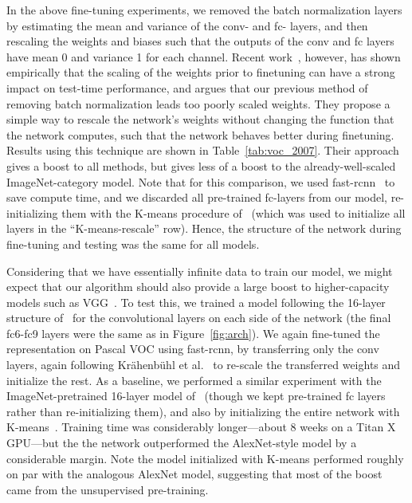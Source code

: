 \documentclass[10pt,twocolumn,letterpaper]{article}
\begin{document}
In the above fine-tuning experiments, we removed the batch normalization layers by estimating the
mean and variance of the conv- and fc- layers, and then rescaling the weights and biases such that the outputs of the conv and fc layers have mean 0 and variance 1 for each channel.  
Recent work~\cite{krahenbuhl2015data},
however, has shown empirically that the scaling of the weights prior to finetuning can have a
strong impact on test-time performance, and argues that our previous method of
removing batch normalization leads too poorly scaled weights.  They propose a simple way to
rescale the network's weights without changing the function that the network computes, such that
the network behaves better during finetuning.  Results using this technique are shown 
in Table~\ref{tab:voc_2007}.
Their approach gives a boost to all methods, but gives less of a boost to the 
already-well-scaled ImageNet-category model.  Note that for this comparison, we 
used fast-rcnn~\cite{girshickICCV15fastrcnn} to save compute time, and we discarded all 
pre-trained fc-layers from our model, re-initializing them with the K-means procedure 
of~\cite{krahenbuhl2015data}
(which was used to initialize all layers in the ``K-means-rescale'' row).  
Hence, the structure of the network during
fine-tuning and testing was the
same for all models.



Considering that we have essentially infinite data to train our model, we might expect
that our algorithm should also provide a large boost to higher-capacity models such as 
VGG~\cite{Simonyan14c}.  To test this, we trained a model following the 16-layer
structure of~\cite{Simonyan14c} for the convolutional layers on each side of the network 
(the final fc6-fc9 layers were the same as in Figure~\ref{fig:arch}).  
We again
fine-tuned the representation on Pascal VOC using fast-rcnn, by transferring only the 
conv layers, again following Kr{\"a}henb{\"u}hl et al.~\cite{krahenbuhl2015data} to 
re-scale the transferred weights and
initialize the rest.  As a baseline, we performed a similar experiment with the ImageNet-pretrained
16-layer model of~\cite{Simonyan14c} (though we kept pre-trained fc layers
rather than re-initializing them), 
and also by initializing the entire network with
K-means~\cite{krahenbuhl2015data}.  Training time was considerably longer---about 8 weeks
on a Titan X GPU---but the the network outperformed the AlexNet-style model by a considerable
margin.  Note the model initialized with K-means performed roughly on par with the analogous
AlexNet model, suggesting that most of the boost came from the unsupervised pre-training.
\end{document}

